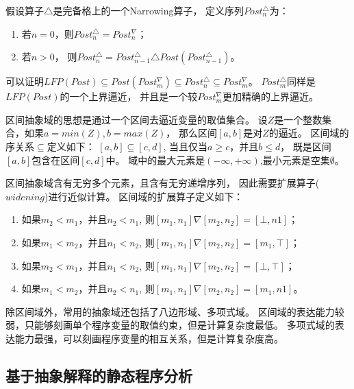 假设算子$\triangle$是完备格上的一个Narrowing算子，
定义序列$Post_{n}^{\triangle}$为：

\begin{enumerate}
	\item 若$n=0$，则$Post_{n}^{\triangle} = Post_{n}^{\nabla}$；
	\item 若$n > 0$，
	则$Post_{n}^{\triangle} = Post_{n-1}^{\triangle} \triangle Post(Post_{n-1}^{\triangle})$。
\end{enumerate}

可以证明$LFP(Post) \subseteq Post(Post_{m}^{\nabla}) 
\subseteq  Post_{n}^{\triangle} \subseteq Post_{m}^{\nabla}$。
$Post_{m}^{\triangle}$同样是$LFP(Post)$的一个上界逼近，
并且是一个较$Post_{m}^{\nabla}$更加精确的上界逼近。


\begin{example}
	区间抽象域的思想是通过一个区间去逼近变量的取值集合。
	设$Z$是一个整数集合，如果$a=min(Z), b=max(Z)$，
	那么区间$[a,b]$是对$Z$的逼近。
	区间域的序关系$\subseteq$定义如下： $[a,b] \subseteq [c,d]$,
	当且仅当$a \geq c$，并且$b \leq d$，
	既是区间$[a,b]$包含在区间$[c,d]$中。
	域中的最大元素是$(-\infty, +\infty)$,最小元素是空集$\emptyset$。
	
	区间抽象域含有无穷多个元素，且含有无穷递增序列，
	因此需要扩展算子($widening$)进行近似计算。
	区间域的扩展算子定义如下：
	
	\begin{enumerate}
	\item 如果$m_2 < m_1$，并且$n_2 < n_1$,		
	则$[m_1, n_1] \nabla [m_2, n_2] = [\bot, n1]$；
	\item 如果$m_1 < m_2$，并且$n_1 < n_2$,
	则$[m_1, n_1] \nabla [m_2, n_2] = [m_1, \top]$；
	\item 如果$m_2 < m_1$，并且$n_1 < n_2$,
	则$[m_1, n_1] \nabla [m_2, n_2] = [\bot, \top]$；
	\item  如果$m_1 < m_2$，并且$n_2 < n_1$,
	则$[m_1, n_1] \nabla [m_2, n_2] = [m_1, n1]$。
	\end{enumerate}
\end{example}

除区间域外，常用的抽象域还包括了八边形域、多项式域。
区间域的表达能力较弱，只能够刻画单个程序变量的取值约束，但是计算复杂度最低。
多项式域的表达能力最强，可以刻画程序变量的相互关系，但是计算复杂度高。

\subsection{基于抽象解释的静态程序分析}

